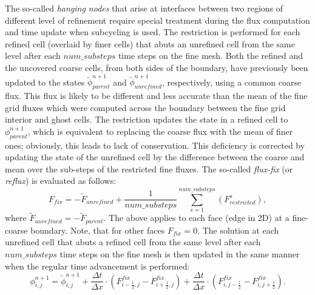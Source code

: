 The so-called \textit{hanging nodes} that arise at interfaces between
two regions of different level of refinement require special treatment
during the flux computation and time update when subcycling is used.
The restriction is performed for each refined cell (overlaid by finer
cells) that abuts an unrefined cell from the same level after each
$num\_substeps$ time steps on the fine mesh. Both the refined and the
uncovered coarse cells, from both sides of the boundary, have
previously been updated to the states $\tilde \phi^{n+1}_{parent}$ and
$\tilde \phi^{n+1}_{unrefined}$, respectively, using a common coarse
flux.  This flux is likely to be different and less accurate than the
mean of the fine grid fluxes which were computed across the boundary
between the fine grid interior and ghost cells.  The restriction
updates the state in a refined cell to $\phi^{n+1}_{parent}$, which is
equivalent to replacing the coarse flux with the mean of finer ones;
obviously, this leads to lack of conservation. This deficiency is
corrected by updating the state of the unrefined cell by the
difference between the coarse and mean over the sub-steps of the
restricted fine fluxes. The so-called \textit{flux-fix} (or
\textit{reflux}) is evaluated as follows:
\begin{equation}
\label{eq:fluxfix}
F_{fix} = - \tilde F_{unrefined}
+ \frac{1}{num\_substeps}  \sum_{s=1}^{num\_substeps} \left( F^{s}_{restricted} \right) ,
\end{equation}
where $\tilde F_{unrefined} = - \tilde F_{parent}$.  The above applies
to each face (edge in 2D) at a fine-coarse boundary. Note, that for
other faces $F_{fix} = 0$.  The solution at each unrefined cell that
abuts a refined cell from the same level after each $num\_substeps$
time steps on the fine mesh is then updated in the same manner when
the regular time advancement is performed:
\begin{equation}
\label{eq:apply_fluxfix}
\phi^{n+1}_{i,j}=\tilde \phi^{n+1}_{i,j}
+ \frac{\Delta t }{\Delta x } \cdot \left( F^{fix}_{i-\frac{1}{2},j} - F^{fix}_{i+\frac{1}{2},j} \right)
+ \frac{\Delta t }{\Delta x } \cdot \left( F^{fix}_{i,j-\frac{1}{2}} - F^{fix}_{i,j+\frac{1}{2}} \right).
\end{equation}

